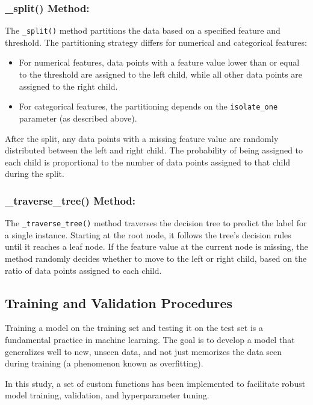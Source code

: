 \documentclass{article}
\begin{document}
\subsubsection*{\_split() Method:}

The \texttt{\_split()} method partitions the data based on a specified feature and threshold. The partitioning strategy differs for numerical and categorical features:

\begin{itemize}
\item For numerical features, data points with a feature value lower than or equal to the threshold are assigned to the left child, while all other data points are assigned to the right child.
\item For categorical features, the partitioning depends on the \texttt{isolate\_one} parameter (as described above).
\end{itemize}

After the split, any data points with a missing feature value are randomly distributed between the left and right child. The probability of being assigned to each child is proportional to the number of data points assigned to that child during the split.

\subsubsection*{\_traverse\_tree() Method:}

The \texttt{\_traverse\_tree()} method traverses the decision tree to predict the label for a single instance. Starting at the root node, it follows the tree's decision rules until it reaches a leaf node. If the feature value at the current node is missing, the method randomly decides whether to move to the left or right child, based on the ratio of data points assigned to each child.

\subsection{Training and Validation Procedures}

Training a model on the training set and testing it on the test set is a fundamental practice in machine learning. The goal is to develop a model that generalizes well to new, unseen data, and not just memorizes the data seen during training (a phenomenon known as overfitting).

In this study, a set of custom functions has been implemented to facilitate robust model training, validation, and hyperparameter tuning.
\end{document}
